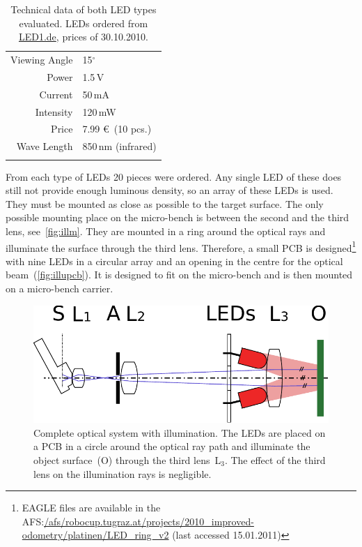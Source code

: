 \documentclass[12pt,a4paper]{article}
\begin{document}
\begin{table}[htbp]
\begin{minipage}{0.45\textwidth}
\begin{tabular}{r|l}
       Viewing Angle  & 15$^\circ$     \\
       Power & 1.5\,V     \\
       Current & 50\,mA     \\
       Intensity & 120\,mW     \\
       Price & 7.99 \euro\ (10 pcs.)     \\
       Wave Length & 850\,nm (infrared)     \\
       &
    \end{tabular}
  \end{minipage}
  \caption{Technical data of both LED types evaluated.
  LEDs ordered from \href{http://www.led1.de}{LED1.de}, prices of 30.10.2010.}
  \label{table:leds}
\end{table}

From each type of LEDs 20 pieces were ordered.
Any single LED of these does still not provide enough luminous density, so an array of these LEDs is used.
They must be mounted as close as possible to the target surface.
The only possible mounting place on the micro-bench is between the second and the third lens, see~\autoref{fig:illm}.
They are mounted in a ring around the optical rays and illuminate the surface through the third lens.
Therefore, a small PCB is designed\footnote{EAGLE files are available in the AFS:\url{/afs/robocup.tugraz.at/projects/2010_improved-odometry/platinen/LED_ring_v2} (last accessed 15.01.2011)} with nine LEDs in a circular array and an opening in the centre for the optical beam~(\autoref{fig:illupcb}).
It is designed to fit on the micro-bench and is then mounted on a micro-bench carrier.

\begin{figure}[htbp]
\begin{center}
\includegraphics[width=0.8\columnwidth]{figures/sketch-optic.pdf}
\caption{\label{fig:illm}
Complete optical system with illumination.
The LEDs are placed on a PCB in a circle around the optical ray path and illuminate the object surface~(O) through the third lens~L$_3$.
The effect of the third lens on the illumination rays is negligible.
}
\end{center}
\end{figure}
\end{document}
